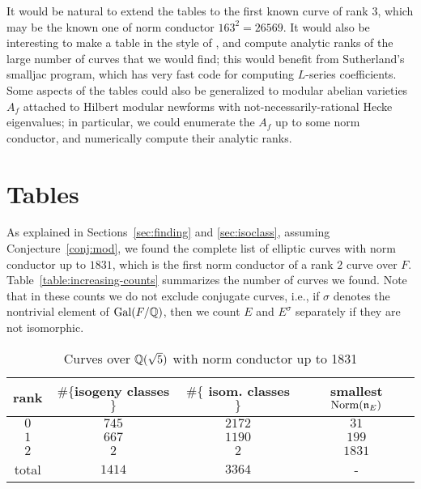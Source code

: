 \documentclass{amsart}
\newcommand{\n}{\mathfrak{n}}
\begin{document}
It would be natural to extend the tables to the first known curve of
rank $3$, which may be the known one of norm conductor $163^2=26569$.
It would also be interesting to make a table in the style of
\cite{stein-watkins:ants5}, and compute analytic ranks of the large
number of curves that we would find; this would benefit from
Sutherland's smalljac program, which has very fast code for computing
$L$-series coefficients.  Some aspects of the tables could also be
generalized to modular abelian varieties $A_f$ attached to Hilbert
modular newforms with not-necessarily-rational Hecke eigenvalues; in
particular, we could enumerate the $A_f$ up to some norm conductor,
and numerically compute their analytic ranks.

\section{Tables}\label{sec:tables}

As explained in Sections~\ref{sec:finding} and \ref{sec:isoclass},
assuming Conjecture~\ref{conj:mod}, we found the complete list of
elliptic curves with norm conductor up to $1831$, which is the first
norm conductor of a rank $2$ curve over $F$.  Table~\ref{table:increasing-counts}
summarizes the number of curves we found.  Note that in these counts
we do not exclude conjugate curves, i.e., if $\sigma$ denotes the
nontrivial element of $\operatorname{Gal}(F/\mathbb{Q})$, then we count $E$ and $E^{\sigma}$
separately if they are not isomorphic.  

\begin{center}
\begin{table}
\caption{Curves over $\mathbb{Q}(\sqrt{5})$ with norm conductor up to 1831\label{table:total-counts}}
\begin{tabular}{|c|c|c|c|}\hline
{\bf rank} & $\#\{${\bf isogeny classes }$\}$ &  $\#\{$ {\bf isom. classes }$\}$ &{\bf smallest $\Norm(\n_E)$} \\\hline
 $0$  & $745$  & $2172$ & $31$\\\hline
 $1$  & $667$  & $1190$ & $199$ \\\hline
 $2$  & $2$    & $2$    & $1831$ \\\hline
total & $1414$ & $3364$ & - \\\hline
\end{tabular}
\end{table}
\end{center}
\end{document}
